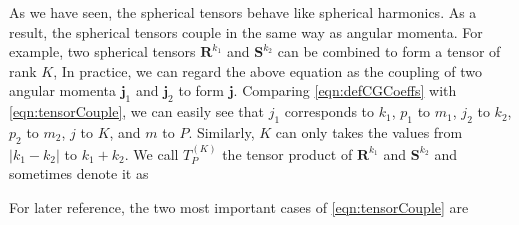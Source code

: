 As we have seen, the spherical tensors behave like spherical harmonics. As a result, the spherical tensors  
couple in the same way as angular momenta. For example, two spherical tensors $\mathbf{R}^{k_1}$ and  
$\mathbf{S}^{k_2}$ can be combined to form a tensor of rank $K$,
In practice, we can regard the above equation as the coupling of two angular momenta $\mathbf{j}_1$ and 
$\mathbf{j}_2$ to form $\mathbf{j}$. Comparing \autoref{eqn:defCGCoeffs} with \autoref{eqn:tensorCouple}, we can easily see that $j_1$ corresponds to $k_1$, $p_1$ to $m_1$, $j_2$ to $k_2$, $p_2$ to $m_2$,
$j$ to $K$, and $m$ to $P$. Similarly, $K$ can only takes the values from $|k_1 - k_2|$ to $k_1 + k_2$. We call 
$T_{P}^{(K)}$ the tensor product of $\mathbf{R}^{k_1}$ and  $\mathbf{S}^{k_2}$ and sometimes denote it as

For later reference, the two most important cases of \autoref{eqn:tensorCouple} are\cite{zare-book}


